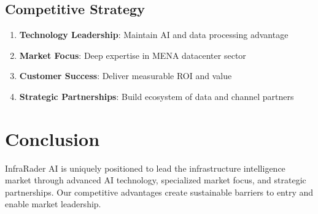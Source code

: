 \documentclass[business]{../templates/infraradar-main}
\begin{document}
\subsection{Competitive Strategy}
\begin{enumerate}
    \item \textbf{Technology Leadership}: Maintain AI and data processing advantage
    \item \textbf{Market Focus}: Deep expertise in MENA datacenter sector
    \item \textbf{Customer Success}: Deliver measurable ROI and value
    \item \textbf{Strategic Partnerships}: Build ecosystem of data and channel partners
\end{enumerate}

\section{Conclusion}

InfraRader AI is uniquely positioned to lead the infrastructure intelligence market through advanced AI technology, specialized market focus, and strategic partnerships. Our competitive advantages create sustainable barriers to entry and enable market leadership.
\end{document}
